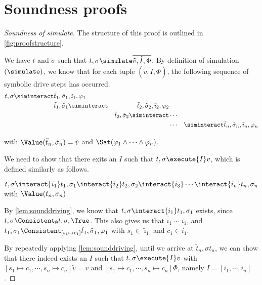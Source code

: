 
\section{Soundness proofs}
\label{sec:soundnessproofs}


\begin{proof}[Soundness of simulate]
  The structure of this proof is outlined in \cref{fig:proofstructure}.

  We have $t$ and $\sigma$ such that $t,\sigma\simulate\overline{\tilde{v},\tilde{I},\Phi}$.
  By definition of simulation $(\simulate)$, we know that for each tuple $(\tilde{v},\tilde{I},\Phi)$,
  the following sequence of symbolic drive steps has occurred.
  \begin{align*}
      t,\sigma\siminteract&\tilde{t}_1,\tilde{\sigma}_1,\tilde{\imath}_1,\phi_1&\\
                      &\tilde{t}_1,\tilde{\sigma}_1\siminteract&\tilde{t}_2,\tilde{\sigma}_2,\tilde{\imath}_2,\phi_2\\
                      &                                    &\tilde{t}_2,\tilde{\sigma}_2\siminteract&\cdots&\\
                      &                                    &                                    &\cdots&
                      \siminteract\tilde{t}_n,\tilde{\sigma}_n,\tilde{\imath}_n,\phi_n
  \end{align*}

  with $\Value(\tilde{t}_n,\tilde{\sigma}_n)=\tilde{v}$ and $\Sat(\phi_1\land\cdots\land\phi_n)$.

  We need to show that there exits an $I$ such that $t,\sigma\execute{I}v$, which is defined similarly as follows.

  $t,\sigma\interact{i_1}t_1,\sigma_1\interact{i_2}t_2,\sigma_2\interact{i_3}\cdots \interact{i_n}t_n,\sigma_n$ with $\Value(t_n,\sigma_n)$.

  By \cref{lem:sounddriving}, we know that $t,\sigma\interact{i_1}t_1,\sigma_1$ exists, since $t,\sigma\Consistent_{\emptyset}t,\sigma,\True$.
  This also gives us that $\tilde{i_1}\sim i_1$, and $t_1,\sigma_1\Consistent_{[s_1\mapsto c_1]}\tilde{t}_1,\tilde{\sigma}_1,\phi_1$ with $s_1\in\tilde{\imath}_1$ and $c_1\in i_1$.

  By repeatedly applying \cref{lem:sounddriving}, until we arrive at $\tilde{t}_n,\sigma{t}_n$,
  we can show that there indeed exists an $I$ such that $t,\sigma\execute{I}v$ with $[s_1\mapsto c_1,\cdots,s_n\mapsto c_n]\tilde{v}=v$
  and $[s_1\mapsto c_1,\cdots,s_n\mapsto c_n]\Phi$, namely $I=[i_1,\cdots,i_n]$.

\end{proof}






